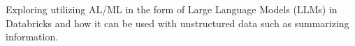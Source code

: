 \begin{cventries}
{\begin{cvitems}
\item {Exploring utilizing AL/ML in the form of Large Language Models (LLMs) in Databricks and how it can be used with unstructured data such as summarizing information.}
\end{cvitems}
}



\end{cventries}
